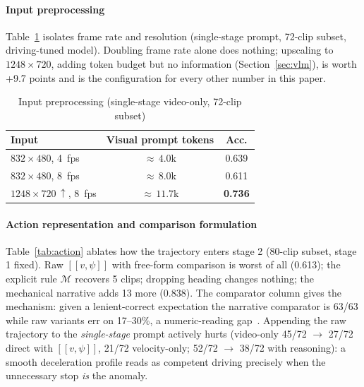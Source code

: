 \documentclass[conference]{IEEEtran}
\newcommand{\Mcal}{\mathcal{M}}            %
\begin{document}
\paragraph{Input preprocessing} Table~\ref{tab:preproc} isolates frame rate and resolution (single-stage prompt, 72-clip subset, driving-tuned model). Doubling frame rate alone does nothing; upscaling to $1248\times720$, adding token budget but no information (Section~\ref{sec:vlm}), is worth +9.7 points and is the configuration for every other number in this paper.

\begin{table}[htbp]
\caption{Input preprocessing (single-stage video-only, 72-clip subset)}
\begin{center}
\footnotesize
\begin{tabular}{|l|c|c|}
\hline
\textbf{Input} & \textbf{Visual prompt tokens} & \textbf{Acc.} \\
\hline
$832\times480$, 4~fps & ${\approx}\,4.0$k & 0.639 \\
\hline
$832\times480$, 8~fps & ${\approx}\,8.0$k & 0.611 \\
\hline
$1248\times720\,{\uparrow}$, 8~fps & ${\approx}\,11.7$k & \textbf{0.736} \\
\hline
\end{tabular}
\label{tab:preproc}
\end{center}
\end{table}

\paragraph{Action representation and comparison formulation} Table~\ref{tab:action} ablates how the trajectory enters stage 2 (80-clip subset, stage 1 fixed). Raw $[[v, \psi]]$ with free-form comparison is worst of all (0.613); the explicit rule $\Mcal$ recovers 5 clips; dropping heading changes nothing; the mechanical narrative adds 13 more (0.838). The comparator column gives the mechanism: given a lenient-correct expectation the narrative comparator is 63/63 while raw variants err on 17--30\%, a numeric-reading gap~\cite{b35,b36}. Appending the raw trajectory to the \emph{single-stage} prompt actively hurts (video-only 45/72 $\rightarrow$ 27/72 direct with $[[v, \psi]]$, 21/72 velocity-only; 52/72 $\rightarrow$ 38/72 with reasoning): a smooth deceleration profile reads as competent driving precisely when the unnecessary stop \emph{is} the anomaly.
\end{document}
